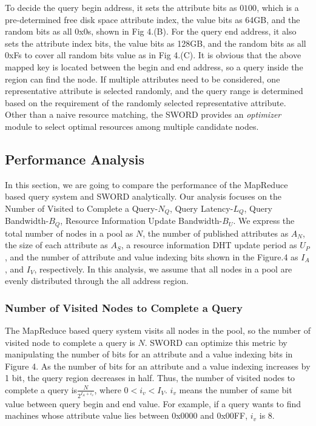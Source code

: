 \documentclass{acm_proc_article-sp}
\begin{document}
To decide the query begin address, it sets the attribute bits as $0100$, which is a pre-determined free disk space attribute index, the value bits as 64GB, and the random bits as all 0x0s, shown in Fig 4.(B).
For the query end address, it also sets the attribute index bits, the value bits as 128GB, and the random bits as all 0xFs to cover all random bits value as in Fig 4.(C).
It is obvious that the above mapped key is located between the begin and end address, so a query inside the region can find the node. 
If multiple attributes need to be considered, one representative attribute is selected randomly, and the query range is determined based on the requirement of the randomly selected representative attribute.
Other than a naive resource matching, the SWORD provides an \textit{optimizer} module to select optimal resources among multiple candidate nodes. 
\subsection{Performance Analysis}
In this section, we are going to compare the performance of the MapReduce based query system and SWORD analytically. 
Our analysis focuses on the Number of Visited to Complete a Query-$N_Q$, Query Latency-$L_Q$, Query Bandwidth-$B_Q$, Resource Information Update Bandwidth-$B_U$.
We express the total number of nodes in a pool as $N$, the number of published attributes as $A_N$, the size of each attribute as $A_S$, a resource information DHT update period as $U_P$, 
and the number of attribute and value indexing bits shown in the Figure.4 as $I_A$, and $I_V$, respectively. In this analysis, we assume that all nodes in a pool are evenly distributed through the all address region.

\subsubsection{Number of Visited Nodes to Complete a Query}
The MapReduce based query system visits all nodes in the pool, so the number of visited node to complete a query is $N$.
SWORD can optimize this metric by manipulating the number of bits for an attribute and a value indexing bits in Figure 4. As the number of bits for an attribute and a value indexing increases by 1 bit, 
the query region decreases in half. Thus, the number of visited nodes to complete a query is\begin{math}\frac{N}{2^{I_A+i_v}}\end{math}, where \begin{math}0<i_v<I_V\end{math}.
\begin{math}i_v\end{math} means the number of same bit value between query begin and end value. For example, if a query wants to find machines whose attribute value lies between 0x0000 and 0x00FF, \begin{math}i_v\end{math} is 8. 
\end{document}
